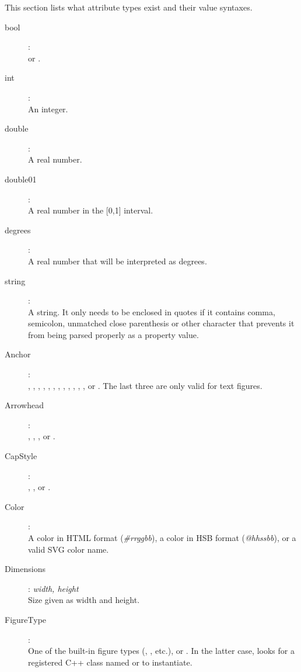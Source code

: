 This section lists what attribute types exist and their value syntaxes.

\begin{description}

\item[bool]: \\
 or .

\item[int]: \\
An integer.

\item[double]: \\
A real number.

\item[double01]: \\
A real number in the [0,1] interval.

\item[degrees]: \\
A real number that will be interpreted as degrees.

\item[string]: \\
A string. It only needs to be enclosed in quotes if it contains comma,
semicolon, unmatched close parenthesis or other character that prevents
it from being parsed properly as a property value.

\item[Anchor]: \\
, , , , , , ,
, , , , , or .
The last three are only valid for text figures.

\item[Arrowhead]: \\
, , , or .

\item[CapStyle]: \\
, , or .

\item[Color]: \\
A color in HTML format (\textit{\#rrggbb}), a color in
HSB format (\textit{@hhssbb}), or a valid SVG color name.

\item[Dimensions]: \textit{width, height} \\
Size given as width and height.

\item[FigureType]: \\
One of the built-in figure types (, , etc.), or
. In the latter case, {\opp} looks for
a registered C++ class named  or
 to instantiate.


\end{description}
